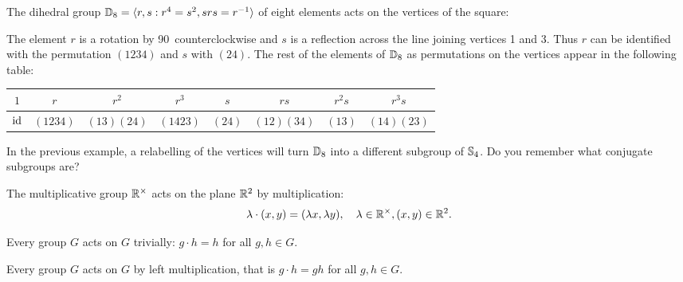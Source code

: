 \begin{example}
    The dihedral group $\mathbb{D}_8=\langle r,s:r^4=s^2,srs=r^{-1}\rangle$ of eight elements acts on the vertices of the square: 
    

The element $r$ is a rotation by 90\textdegree~counterclockwise 
and $s$ is a reflection across the line joining vertices 1 and 3. 
Thus $r$ 
can be identified with the permutation $(1234)$ 
and $s$ with $(24)$. The rest 
of the elements of $\mathbb{D}_8$ as permutations on the vertices
appear in the following table:
\begin{center}
\begin{tabular}{cccccccc}
 $1$ & $r$ & $r^2$ & $r^3$ & $s$ & $rs$ & $r^2s$ & $r^3s$ \\
 \hline 
 $\operatorname{id}$ & $(1234)$ & $(13)(24)$ & $(1423)$ & $(24)$ & $(12)(34)$ & $(13)$ & $(14)(23)$
\end{tabular}
\end{center}
\end{example}

\begin{figure}[h]
\centering
{}
\end{figure}


In the previous example, a relabelling of the vertices 
will turn $\mathbb{D}_8$ into a different subgroup of $\mathbb{S}_4$. Do you remember 
what conjugate subgroups are? 

\begin{example}
    The multiplicative group $\mathbb{R}^{\times}$ acts on the plane $\mathbb{R}^2$ by multiplication: 
    \[ 
    \lambda\cdot (x,y)=(\lambda x,\lambda y),\quad \lambda\in\mathbb{R}^{\times},(x,y)\in\mathbb{R}^2.
    \]
\end{example}

\begin{example}
Every group $G$ acts on $G$ trivially: $g\cdot h=h$ for all $g,h\in G$.
\end{example}

\begin{example}
Every group $G$ acts on $G$ by left multiplication, that is
$g\cdot h=gh$ for all $g,h\in G$.
\end{example}

